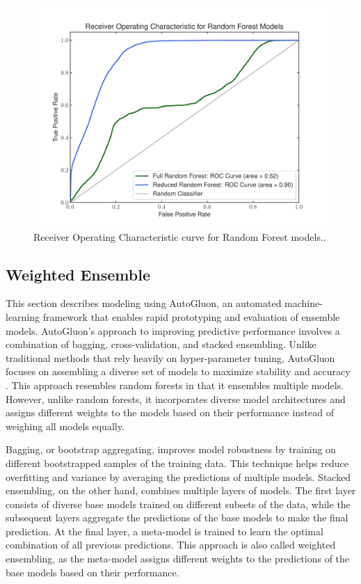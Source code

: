 \documentclass[11pt,letterpaper]{article}
\begin{document}
\begin{figure}[H]
    \centering
    \includegraphics[width=0.9\linewidth]{figs/roc_random_forest.pdf}
    \caption{Receiver Operating Characteristic curve for Random Forest models..}
    \label{fig_roc_random_forest}
\end{figure}


\subsection{Weighted Ensemble}
This section describes modeling using AutoGluon, an automated machine-learning framework that enables rapid prototyping and evaluation of ensemble models. AutoGluon's approach to improving predictive performance involves a combination of bagging, cross-validation, and stacked ensembling. Unlike traditional methods that rely heavily on hyper-parameter tuning, AutoGluon focuses on assembling a diverse set of models to maximize stability and accuracy \parencite{autogluon}. This approach resembles random forests in that it ensembles multiple models. However, unlike random forests, it incorporates diverse model architectures and assigns different weights to the models based on their performance instead of weighing all models equally.

Bagging, or bootstrap aggregating, improves model robustness by training on different bootstrapped samples of the training data. This technique helps reduce overfitting and variance by averaging the predictions of multiple models. Stacked ensembling, on the other hand, combines multiple layers of models. The first layer consists of diverse base models trained on different subsets of the data, while the subsequent layers aggregate the predictions of the base models to make the final prediction. At the final layer, a meta-model is trained to learn the optimal combination of all previous predictions. This approach is also called weighted ensembling, as the meta-model assigns different weights to the predictions of the base models based on their performance.
\end{document}
